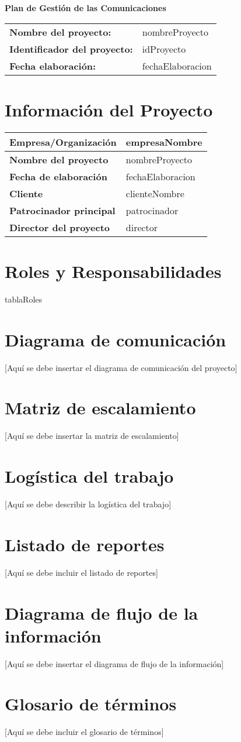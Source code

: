 \documentclass[12pt]{article}
\begin{document}
{\LARGE\textbf{Plan de Gestión de las Comunicaciones}}\\[1cm]

\begin{tabular}{ll}
\textbf{Nombre del proyecto:} & {{nombreProyecto}} \\[0.3cm]
\textbf{Identificador del proyecto:} & {{idProyecto}} \\[0.3cm]
\textbf{Fecha elaboración:} & {{fechaElaboracion}} \\
\end{tabular}

\tableofcontents
\newpage

\section{Información del Proyecto}
\begin{tabular}{|P{5cm}|P{10cm}|}
\hline
\textbf{Empresa/Organización} & {{empresaNombre}} \\
\hline
\textbf{Nombre del proyecto} & {{nombreProyecto}} \\
\hline
\textbf{Fecha de elaboración} & {{fechaElaboracion}} \\
\hline
\textbf{Cliente} & {{clienteNombre}} \\
\hline
\textbf{Patrocinador principal} & {{patrocinador}} \\
\hline
\textbf{Director del proyecto} & {{director}} \\
\hline
\end{tabular}

\section{Roles y Responsabilidades}
{{tablaRoles}}

\section{Diagrama de comunicación}
[Aquí se debe insertar el diagrama de comunicación del proyecto]

\section{Matriz de escalamiento}
[Aquí se debe insertar la matriz de escalamiento]

\section{Logística del trabajo}
[Aquí se debe describir la logística del trabajo]

\section{Listado de reportes}
[Aquí se debe incluir el listado de reportes]

\section{Diagrama de flujo de la información}
[Aquí se debe insertar el diagrama de flujo de la información]

\section{Glosario de términos}
[Aquí se debe incluir el glosario de términos]
\end{document}
